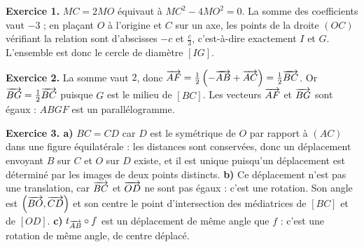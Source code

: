 \begin{corrige}
\textbf{Exercice 1.} $MC = 2MO$ équivaut à $MC^{2}-4MO^{2} = 0$. La somme des
coefficients vaut $-3$ ; en plaçant $O$ à l'origine et $C$ sur un axe, les
points de la droite $(OC)$ vérifiant la relation sont d'abscisses $-c$ et
$\frac c3$, c'est-à-dire exactement $I$ et $G$. L'ensemble est donc le cercle
de diamètre $[IG]$.

\textbf{Exercice 2.} La somme vaut $2$, donc
$\overrightarrow{AF} = \frac12\left(-\overrightarrow{AB}+\overrightarrow{AC}\right) = \frac12\overrightarrow{BC}$. Or
$\overrightarrow{BG} = \frac12\overrightarrow{BC}$ puisque $G$ est le milieu de $[BC]$. Les
vecteurs $\overrightarrow{AF}$ et $\overrightarrow{BG}$ sont égaux : $ABGF$ est un
parallélogramme.

\textbf{Exercice 3. a)} $BC = CD$ car $D$ est le symétrique de $O$ par rapport à
$(AC)$ dans une figure équilatérale : les distances sont conservées, donc un
déplacement envoyant $B$ sur $C$ et $O$ sur $D$ existe, et il est unique
puisqu'un déplacement est déterminé par les images de deux points distincts.
\textbf{b)} Ce déplacement n'est pas une translation, car $\overrightarrow{BC}$ et
$\overrightarrow{OD}$ ne sont pas égaux : c'est une rotation. Son angle est
$\left(\overrightarrow{BO},\overrightarrow{CD}\right)$ et son centre le point d'intersection des
médiatrices de $[BC]$ et de $[OD]$.
\textbf{c)} $t_{\overrightarrow{AB}} \circ f$ est un déplacement de même angle que $f$ :
c'est une rotation de même angle, de centre déplacé.

\end{corrige}
